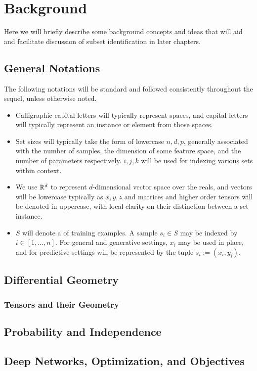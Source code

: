 \chapter{Background}\label{sec:bknd}

Here we will briefly describe some background concepts and ideas that will aid and facilitate discussion of subset identification in later chapters.

\section{General Notations}
The following notations will be standard and followed consistently throughout the sequel, unless otherwise noted.
\begin{itemize}
\item Calligraphic capital letters will typically represent spaces, and capital letters will typically represent an instance or element from those spaces.

\item Set sizes will typically take the form of lowercase $n,d,p$, generally associated with the number of samples, the dimension of some feature space, and the number of parameters respectively. $i,j,k$ will be used for indexing various sets within context.

\item We use $\mathbb{R}^d$ to represent $d$-dimensional vector space over the reals, and vectors will be lowercase typically as $x,y,z$ and matrices and higher order tensors will be denoted in uppercase, with local clarity on their distinction between a set instance.

\item $S$ will denote a of training examples.
A sample $s_i\in S$ may be indexed by $i \in [1,\ldots,n]$. 
For general and generative settings, $x_i$ may be used in place, and for predictive settings will be represented by the tuple $s_i:=(x_i,y_i)$.

\end{itemize}

\section{Differential Geometry}


\subsection{Tensors and their Geometry}


\section{Probability and Independence}


\section{Deep Networks, Optimization, and Objectives}

